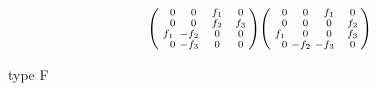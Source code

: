 \documentclass[a4paper]{amsart}
\theoremstyle{definition}
\theoremstyle{remark}
\newenvironment{psmatrix}{\left(\begin{smallmatrix}}{\end{smallmatrix}\right)}
\numberwithin{equation}{section}
\begin{document}
\begin{minipage}[b]{0.48\columnwidth}
\begin{align*}
\begin{psmatrix}
\phantom{-}0&\phantom{-}0&\phantom{-}f_{1}&\phantom{-}0\\
\phantom{-}0&\phantom{-}0&\phantom{-}f_{2}&\phantom{-}f_{3}\\
f_{1}&-f_{2}&\phantom{-}0&\phantom{-}0\\
\phantom{-}0&-f_{3}&\phantom{-}0&\phantom{-}0
\end{psmatrix}
\begin{psmatrix}
\phantom{-}0&\phantom{-}0&\phantom{-}f_{1}&\phantom{-}0\\
\phantom{-}0&\phantom{-}0&\phantom{-}0&\phantom{-}f_{2}\\
f_{1}&\phantom{-}0&\phantom{-}0&\phantom{-}f_{3}\\
\phantom{-}0&-f_{2}&-f_{3}&\phantom{-}0
\end{psmatrix}
\end{align*}
\begin{center}type F\end{center}
\end{minipage}
\end{document}
